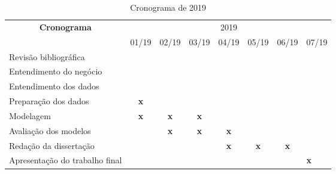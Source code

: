 \begin{small}
\begin{table} [!htbp] 
\centering
\caption{Cronograma de 2019}
\label{cronograma2019}
\begin{tabular}{|l|c|c|c|c|c|c|l|}
\hline
\multicolumn{1}{|c|}{\multirow{2}{*}{\textbf{Cronograma}}} & \multicolumn{7}{c|}{2019}                                                           \\ \cline{2-8} 
\multicolumn{1}{|c|}{}                                     & 01/19      & 02/19      & 03/19      & 04/19      & 05/19      & 06/19      & 07/19 \\ \hline
Revisão bibliográfica                                      & \textbf{}  & \textbf{}  & \textbf{}  & \textbf{}  & \textbf{}  & \textbf{}  &       \\ \hline
Entendimento do negócio                                    & \textbf{}  & \textbf{}  & \textbf{}  & \textbf{}  & \textbf{}  & \textbf{}  &       \\ \hline
Entendimento dos dados                                     & \textbf{}  & \textbf{}  & \textbf{}  & \textbf{}  & \textbf{}  & \textbf{}  &       \\ \hline
Preparação dos dados                                       & \textbf{x} & \textbf{} & \textbf{}  & \textbf{}  & \textbf{}  & \textbf{}  &       \\ \hline
Modelagem                                                  & \textbf{x} & \textbf{x} & \textbf{x} & \textbf{}  & \textbf{}  & \textbf{}  &       \\ \hline
Avaliação dos modelos                                      & \textbf{}  & \textbf{x} & \textbf{x} & \textbf{x} & \textbf{}  & \textbf{}  &       \\ \hline
Redação da dissertação                                     & \textbf{}  & \textbf{}  & \textbf{}  & \textbf{x} & \textbf{x} & \textbf{x} &       \\ \hline
Apresentação do trabalho final                             & \textbf{}  & \textbf{}  & \textbf{}  & \textbf{}  & \textbf{}  & \textbf{}  & \textbf{x}     \\ \hline
\end{tabular}
\end{table}
\end{small}